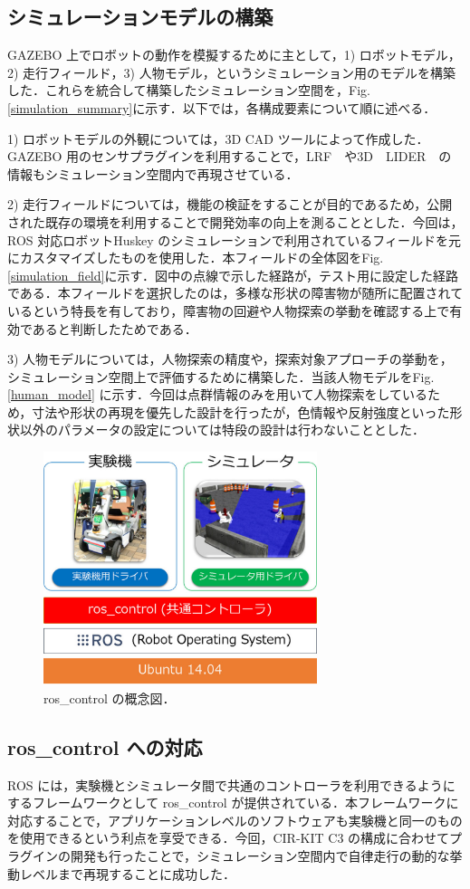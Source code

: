 \documentclass[10pt,a4paper]{jarticle}
\begin{document}
\subsection{シミュレーションモデルの構築}
\label{subsec:simulationmodel}
GAZEBO 上でロボットの動作を模擬するために主として，1) ロボットモデル，2) 走行フィールド，3) 人物モデル，というシミュレーション用のモデルを構築した．これらを統合して構築したシミュレーション空間を，Fig.\ref{simulation_summary}に示す．以下では，各構成要素について順に述べる．

1) ロボットモデルの外観については，3D CAD ツールによって作成した．GAZEBO 用のセンサプラグインを利用することで，LRF　や3D　LIDER　の情報もシミュレーション空間内で再現させている．

2) 走行フィールドについては，機能の検証をすることが目的であるため，公開された既存の環境を利用することで開発効率の向上を測ることとした．今回は，ROS 対応ロボットHuskey \cite{husky} のシミュレーションで利用されているフィールドを元にカスタマイズしたものを使用した．本フィールドの全体図をFig.\ref{simulation_field}に示す．図中の点線で示した経路が，テスト用に設定した経路である．本フィールドを選択したのは，多様な形状の障害物が随所に配置されているという特長を有しており，障害物の回避や人物探索の挙動を確認する上で有効であると判断したためである．

3) 人物モデルについては，人物探索の精度や，探索対象アプローチの挙動を，シミュレーション空間上で評価するために構築した．当該人物モデルをFig. \ref{human_model} に示す．今回は点群情報のみを用いて人物探索をしているため，寸法や形状の再現を優先した設計を行ったが，色情報や反射強度といった形状以外のパラメータの設定については特段の設計は行わないこととした．

\begin{figure}[ht]
    \centering
    \includegraphics[width=8cm]{./fig/eps/ros_control.eps}
    \caption{ros\_control の概念図．}
    \label{ros_control}
\end{figure}

\subsection{ros\_control への対応}
\label{subsec:ros_control}
ROS には，実験機とシミュレータ間で共通のコントローラを利用できるようにするフレームワークとして ros\_control \cite{ros_control_wiki} が提供されている．本フレームワークに対応することで，アプリケーションレベルのソフトウェアも実験機と同一のものを使用できるという利点を享受できる．今回，CIR-KIT C3 の構成に合わせてプラグインの開発も行ったことで，シミュレーション空間内で自律走行の動的な挙動レベルまで再現することに成功した．
\end{document}
